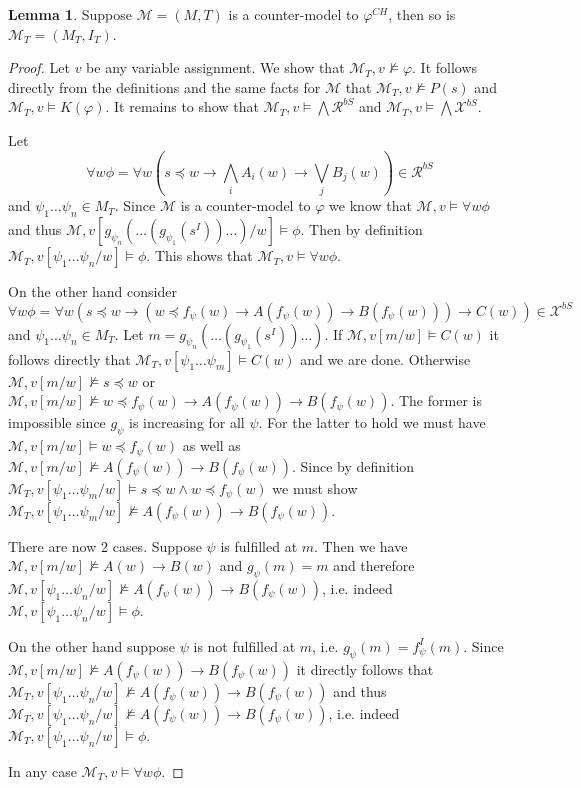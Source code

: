 \documentclass{easychair}
\theoremstyle{definition}
\theoremstyle{definition}
\theoremstyle{definition}
\newtheorem{lemma}[theorem]{Lemma}
\theoremstyle{definition}
\theoremstyle{definition}
\theoremstyle{definition}
\theoremstyle{definition}
\begin{document}
\begin{lemma}\label{proof:prop-simplification}
	Suppose $\mathcal M=(M, T)$ is a counter-model to $\varphi^{CH}$, then so is $\mathcal M_T = (M_T, I_T)$.
\end{lemma}
\begin{proof}
	Let $v$ be any variable assignment. We show that $\mathcal M_T, v\not\models \varphi$. It follows directly from the definitions and the same facts for $\mathcal M$ that $\mathcal M_T, v\not\models P(s)$ and $\mathcal M_T, v\models K(\varphi)$. It remains to show that $\mathcal M_T, v\models\bigwedge \mathcal R^{bS}$ and $\mathcal M_T, v\models \bigwedge\mathcal X^{bS}$.
	
	Let \[\forall w\phi = \forall w\left(s\preceq w\to\bigwedge_i A_i(w)\to \bigvee_j B_j(w)\right)\in\mathcal R^{bS}\] and $\psi_1\dots\psi_n\in M_T$. Since $\mathcal M$ is a counter-model to $\varphi$ we know that $\mathcal M, v\models\forall w\phi$ and thus $\mathcal M, v[g_{\psi_n}(\dots(g_{\psi_1}(s^I))\dots)/w]\models \phi$. Then by definition $\mathcal M_T, v[\psi_1\dots\psi_n/w]\models\phi$. This shows that $\mathcal M_T, v\models\forall w\phi$.

	On the other hand consider \[\forall w\phi = \forall w(s\preceq w\to(w\preceq f_\psi(w)\to A(f_\psi(w))\to B(f_\psi(w)))\to C(w))\in\mathcal X^{bS}\] and $\psi_1\dots\psi_n\in M_T$. Let $m = g_{\psi_n}(\dots(g_{\psi_1}(s^I))\dots)$. If $\mathcal M, v[m/w]\models C(w)$ it follows directly that $\mathcal M_T, v[\psi_1\dots\psi_m]\models C(w)$ and we are done. Otherwise $\mathcal M, v[m/w]\not\models s\preceq w$ or $\mathcal M, v[m/w]\not\models w\preceq f_\psi(w)\to A(f_\psi(w)) \to B(f_\psi(w))$. The former is impossible since $g_\psi$ is increasing for all $\psi$. For the latter to hold we must have $\mathcal M, v[m/w]\models w\preceq f_\psi(w)$ as well as $\mathcal M, v[m/w]\not\models A(f_\psi(w))\to B(f_\psi(w))$. Since by definition $\mathcal M_T, v[\psi_1\dots\psi_m/w]\models s\preceq w\wedge w\preceq f_\psi(w)$ we must show $\mathcal M_T, v[\psi_1\dots\psi_m/w]\not\models A(f_\psi(w))\to B(f_\psi(w))$.
	
	There are now 2 cases. Suppose $\psi$ is fulfilled at $m$. Then we have $\mathcal M, v[m/w]\not\models A(w)\to B(w)$ and $g_\psi(m) = m$ and therefore $\mathcal M, v[\psi_1\dots\psi_n/w]\not\models A(f_\psi(w))\to B(f_\psi(w))$, i.e. indeed $\mathcal M, v[\psi_1\dots\psi_n/w]\models\phi$. 
	
	On the other hand suppose $\psi$ is not fulfilled at $m$, i.e. $g_\psi(m) = f^I_\psi(m)$. Since $\mathcal M, v[m/w]\not\models A(f_\psi(w))\to B(f_\psi(w))$ it directly follows that $\mathcal M_T, v[\psi_1\dots\psi_n/w]\not\models A(f_\psi(w))\to B(f_\psi(w))$ and thus $\mathcal M_T, v[\psi_1\dots\psi_n/w]\not\models A(f_\psi(w))\to B(f_\psi(w))$, i.e. indeed $\mathcal M_T, v[\psi_1\dots\psi_n/w]\models\phi$.

	In any case $\mathcal M_T, v\models\forall w\phi$.
\end{proof}
\end{document}
